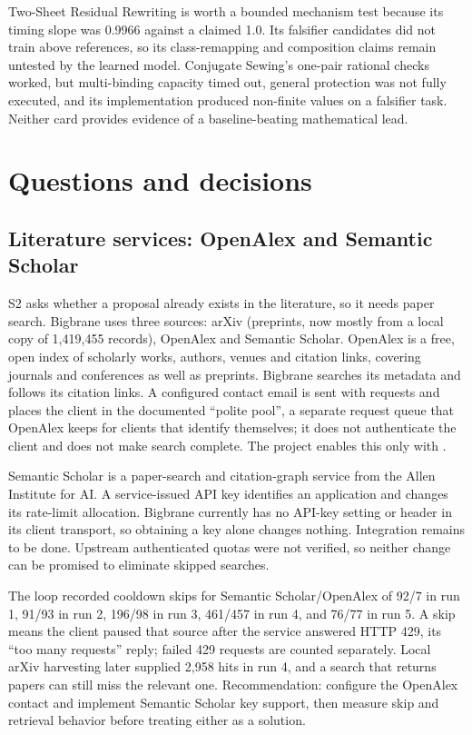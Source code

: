 Two-Sheet Residual Rewriting is worth a bounded mechanism test because its timing slope was 0.9966 against a claimed 1.0. Its falsifier candidates did not train above references, so its class-remapping and composition claims remain untested by the learned model. Conjugate Sewing's one-pair rational checks worked, but multi-binding capacity timed out, general protection was not fully executed, and its implementation produced non-finite values on a falsifier task. Neither card provides evidence of a baseline-beating mathematical lead.

\section{Questions and decisions}

\subsection{Literature services: OpenAlex and Semantic Scholar}

S2 asks whether a proposal already exists in the literature, so it needs paper search. Bigbrane uses three sources: arXiv (preprints, now mostly from a local copy of 1,419,455 records), OpenAlex and Semantic Scholar. OpenAlex is a free, open index of scholarly works, authors, venues and citation links, covering journals and conferences as well as preprints. Bigbrane searches its metadata and follows its citation links. A configured contact email is sent with requests and places the client in the documented ``polite pool'', a separate request queue that OpenAlex keeps for clients that identify themselves; it does not authenticate the client and does not make search complete. The project enables this only with .

Semantic Scholar is a paper-search and citation-graph service from the Allen Institute for AI. A service-issued API key identifies an application and changes its rate-limit allocation. Bigbrane currently has no API-key setting or  header in its client transport, so obtaining a key alone changes nothing. Integration remains to be done. Upstream authenticated quotas were not verified, so neither change can be promised to eliminate skipped searches.

The loop recorded cooldown skips for Semantic Scholar/OpenAlex of 92/7 in run 1, 91/93 in run 2, 196/98 in run 3, 461/457 in run 4, and 76/77 in run 5. A skip means the client paused that source after the service answered HTTP 429, its ``too many requests'' reply; failed 429 requests are counted separately. Local arXiv harvesting later supplied 2,958 hits in run 4, and a search that returns papers can still miss the relevant one. Recommendation: configure the OpenAlex contact and implement Semantic Scholar key support, then measure skip and retrieval behavior before treating either as a solution.

